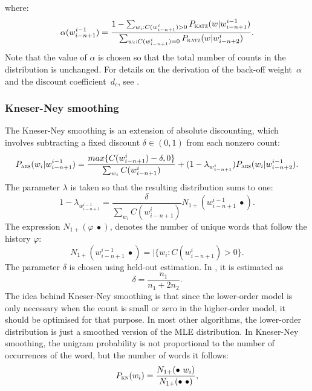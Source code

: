 	where:
        \begin{equation}
            \alpha(w_{i-n+1}^{i-1})=\frac{1-\sum_{w_{i}:C(w_{i-n+1}^{i})>0}P_{\textsc{katz}}(w|w_{i-n+1}^{i-1})}{\sum_{w_{i}:C(w_{i-n+1}^{i})=0}P_{\textsc{katz}}(w|w_{i-n+2}^{i})}.
        \end{equation}
        Note that the value of $\alpha$ is chosen so that the total number of counts in the distribution is unchanged. For details on the derivation of the back-off weight~$\alpha$ and the discount coefficient~$d_{c}$, see \cite{chen1996empirical}.
	\subsubsection*{Kneser-Ney smoothing}
	The Kneser-Ney smoothing is an extension of absolute discounting, which involves subtracting a fixed discount $\delta \in (0, 1)$ from each nonzero count:
	\begin{equation}
		P_{\textsc{abs}}(w_{i}|w_{i-n+1}^{i-1})= \frac{max\{C(w_{i-n+1}^{i})-\delta, 0\}}{\sum_{w_{i}}C(w_{i-n+1}^{i})}+(1-\lambda_{w_{i-n+1}^{i}})P_{\textsc{abs}}(w_{i}|w_{i-n+2}^{i-1}).
	\end{equation}
	The parameter $\lambda$ is taken so that the resulting distribution sums to one:
	\begin{equation}
		1-\lambda_{w_{i-n+1}^{i-1}}=\frac{\delta}{\sum_{w_{i}}C(w_{i-n+1}^{i})}N_{1+}(w_{i-n+1}^{i-1}~\bullet).
	\end{equation}
	The expression $N_{1+}(\varphi~\bullet)$, denotes the number of unique words that follow the history $\varphi$:
	\begin{equation}
		N_{1+}(w_{i-n+1}^{i-1}~\bullet)=|\{w_{i}:C(w_{i-n+1}^{i}) > 0\}.
	\end{equation}
	The parameter $\delta$ is chosen using held-out estimation. In \cite{ney1994structuring}, it is estimated as 
	\begin{equation}
		\delta=\frac{n_{1}}{n_{1}+2n_{2}}.
	\end{equation}
	The idea behind Kneser-Ney smoothing is that since the lower-order model is only necessary when the count is small or zero in the higher-order model, it should be optimised for that purpose. In most other algorithms, the lower-order distribution is just a smoothed version of the MLE distribution. In Kneser-Ney smoothing, the unigram probability is not proportional to the number of occurrences of the word, but the number of words it follows:
	\begin{equation}
		P_{\textsc{kn}}(w_{i})=\frac{N_{1+}(\bullet~w_{i})}{N_{1+}(\bullet~\bullet)},
		\label{equation:kneser-ney}
	\end{equation}
